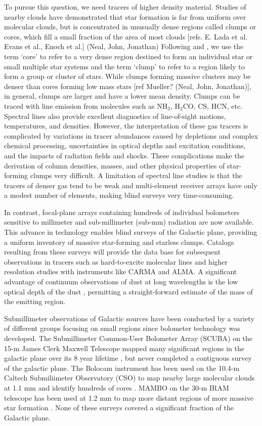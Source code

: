 \documentclass[12pt,preprint]{aastex}
\newcommand{\ammonia}{\mbox{{\rm NH}$_3$}}
\newcommand{\form}{H$_2$CO}
\begin{document}
To pursue this question, we need tracers of higher density material.
Studies of nearby clouds have demonstrated that star formation is far
from uniform over molecular clouds, but is concentrated in unusually dense
regions called clumps or cores, which fill a small fraction of the area of most
clouds \citep{enoch06,evans09}[refs. E. Lada et al. Evans et al., Enoch et al.]
(Neal, John, Jonathan) Following \citet{williams00} and \citep{mckee07}, we use
the term `core' to refer to a very dense region destined to form an individual
star or small multiple star systems and the term `clump' to refer to a region
likely to form a group or cluster of stars. While clumps forming massive
clusters may be denser than cores forming low mass stars [ref Mueller? (Neal,
John, Jonathan)], in general, clumps are larger and have a lower mean density. Clumps can be
traced with line emission from molecules such as \ammonia, \form, CS, HCN, etc.
Spectral lines also provide excellent diagnostics of line-of-sight motions,
temperatures, and densities.  However, the interpretation of these gas tracers
is complicated by variations in tracer abundances caused by depletions and
complex chemical processing, uncertainties in optical depths and excitation
conditions, and the impacts of radiation fields and shocks. These complications
make the derivation of column densities, masses, and other physical properties
of star-forming clumps very difficult.  A limitation of spectral line studies
is that the tracers of denser gas tend to be weak and multi-element receiver
arrays have only a modest number of elements, making blind surveys very
time-consuming.

In contrast, focal-plane arrays containing hundreds of individual bolometers
sensitive to millimeter and sub-millimeter (sub-mm) radiation are now
available. This advance in technology enables blind surveys of the Galactic
plane, providing a uniform inventory of massive star-forming and starless
clumps.  Catalogs resulting from these surveys will provide the data base for
subsequent observations in tracers such as hard-to-excite molecular lines and
higher resolution studies with instruments like CARMA and ALMA.  A significant
advantage of continuum observations of dust at long wavelengths is the low
optical depth of the dust \citep{johnstone06}, permitting a straight-forward
estimate of the mass of the emitting region.

Submillimeter observations of Galactic sources have been conducted by
a variety of different groups focusing on small regions since
bolometer technology was developed.  The Submillimeter Common-User
Bolometer Array (SCUBA) on the 15-m James Clerk Maxwell Telescope
mapped many significant regions in the galactic plane over its 8 year
lifetime \citep{holland99,difrancesco08}, but never completed a
contiguous survey of the galactic plane.  The Bolocam instrument has been
used on the 10.4-m Caltech Submiliimeter Observatory (CSO) to map nearby large
molecular clouds at 1.1 mm and identify hundreds of cores \citep{enoch06}.
MAMBO on the 30-m IRAM telescope has been used at 1.2 mm to map
more distant regions of more massive star formation \citep{motte07}.
None of these surveys covered a significant fraction of the Galactic plane.
\end{document}

